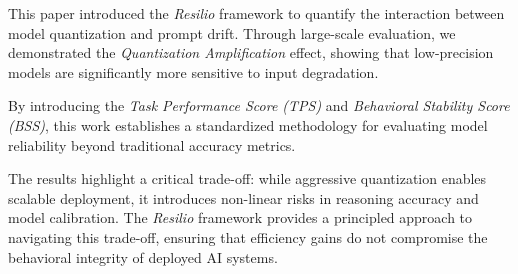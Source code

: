 \documentclass[conference]{IEEEtran}
\begin{document}
This paper introduced the \textit{Resilio} framework to quantify the interaction between model quantization and prompt drift. Through large-scale evaluation, we demonstrated the \textit{Quantization Amplification} effect, showing that low-precision models are significantly more sensitive to input degradation.

By introducing the \textit{Task Performance Score (TPS)} and \textit{Behavioral Stability Score (BSS)}, this work establishes a standardized methodology for evaluating model reliability beyond traditional accuracy metrics.

The results highlight a critical trade-off: while aggressive quantization enables scalable deployment, it introduces non-linear risks in reasoning accuracy and model calibration. The \textit{Resilio} framework provides a principled approach to navigating this trade-off, ensuring that efficiency gains do not compromise the behavioral integrity of deployed AI systems.

\end{document}
